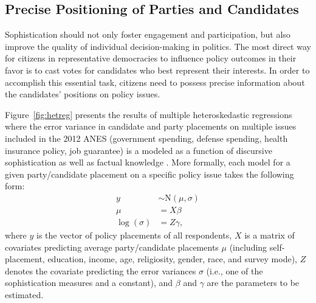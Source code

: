 \documentclass[12pt]{article}
\begin{document}
\subsection*{Precise Positioning of Parties and Candidates}

Sophistication should not only foster engagement and participation, but also improve the quality of individual decision-making in politics. The most direct way for citizens in representative democracies to influence policy outcomes in their favor is to cast votes for candidates who best represent their interests. In order to accomplish this essential task, citizens need to possess precise information about the candidates' positions on policy issues.

Figure~\ref{fig:hetreg} presents the results of multiple heteroskedastic regressions where the error variance in candidate and party placements on multiple issues included in the 2012 ANES (government spending, defense spending, health insurance policy, job guarantee) is a modeled as a function of discursive sophistication as well as factual knowledge \citep[see][for a similar procedure]{jacoby2006value}. More formally, each model for a given party/candidate placement on a specific policy issue takes the following form:
\begin{align}
y &\sim \text{N}(\mu, \sigma) \\
\mu &= X\beta \\
\log(\sigma) &= Z\gamma,
\end{align}
where $y$ is the vector of policy placements of all respondents, $X$ is a matrix of covariates predicting average party/candidate placements $\mu$ (including self-placement, education, income, age, religiosity, gender, race, and survey mode), $Z$ denotes the covariate predicting the error variances $\sigma$ (i.e., one of the sophistication measures and a constant), and $\beta$ and $\gamma$ are the parameters to be estimated.
\end{document}
